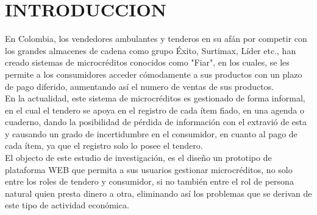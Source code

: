 \chapter*{INTRODUCCION}

{En Colombia, los vendedores ambulantes y tenderos en su afán por competir con los grandes almacenes de cadena como grupo Éxito, Surtimax, Líder etc., han creado sistemas de microcréditos conocidos como "Fiar", en los cuales, se les permite a los consumidores acceder cómodamente a sus productos con un plazo de pago diferido, aumentando así el numero de ventas de sus productos.\\

En la actualidad, este sistema de microcréditos es gestionado de forma informal, en el cual el tendero se apoya en el registro de cada ítem fiado, en una agenda o cuaderno, dando la posibilidad de pérdida de información con el extravió de esta y causando un grado de incertidumbre en el consumidor, en cuanto al pago de cada ítem, ya que el registro solo lo posee el tendero.\\

El objecto de este estudio de investigación, es el diseño un prototipo de plataforma WEB que permita a sus usuarios gestionar microcréditos, no solo entre  los roles de tendero y consumidor, si no también entre el rol de persona natural quien presta dinero a otra, eliminando así los problemas que se derivan de este tipo de actividad económica.}